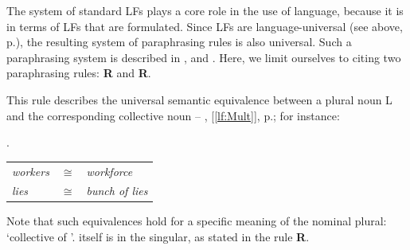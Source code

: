 The system of standard LFs plays a core role in the use of language, because it is in terms of LFs that  are formulated. Since LFs are language-universal (see above, p.\thinspace\pageref{sec:universality}), the resulting system of paraphrasing rules is also universal. Such a paraphrasing system is described in \textcite[141--176]{Melcuk1974}, \textcite[Ch.~6]{Milicevic2007} and \textcite[Ch.~9]{Melcuk2013c-e}. Here, we limit ourselves to citing two paraphrasing rules: \textbf{R} and \textbf{R}.

\begin{center}
\end{center}\label{txt:RParaphMult}

This rule describes the universal semantic equivalence between a plural noun L and the corresponding collective noun  -- , [\ref{lf:Mult}], p.\thinspace\pageref{lf:Mult}; for instance:

\begingroup
\small

\ex. \begin{tabular}[t]{l c l}
     \textit{workers} & {\footnotesize $\cong$} & \textit{workforce} \\
     \textit{lies} & {\footnotesize $\cong$} & \textit{bunch of lies} \\
     \end{tabular}

\endgroup

Note that such equivalences hold for a specific meaning of the nominal plural: `collective of '.  itself is in the singular, as stated in the rule \textbf{R}.

\begin{center}
\end{center}\label{txt:RParaphOper1}

